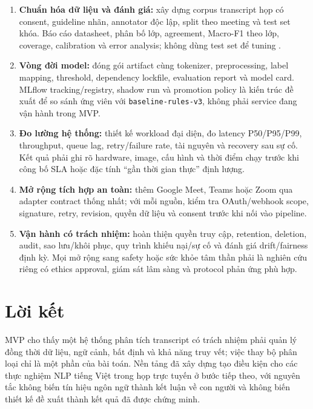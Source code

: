 \begin{enumerate}
  \item \textbf{Chuẩn hóa dữ liệu và đánh giá:} xây dựng corpus transcript họp có consent, guideline nhãn, annotator độc lập, split theo meeting và test set khóa. Báo cáo datasheet, phân bố lớp, agreement, Macro-F1 theo lớp, coverage, calibration và error analysis; không dùng test set để tuning \cite{gebru2021,artstein2008}.
  \item \textbf{Vòng đời model:} đóng gói artifact cùng tokenizer, preprocessing, label mapping, threshold, dependency lockfile, evaluation report và model card. MLflow tracking/registry, shadow run và promotion policy là kiến trúc đề xuất để so sánh ứng viên với \texttt{baseline-rules-v3}, không phải service đang vận hành trong MVP.
  \item \textbf{Đo lường hệ thống:} thiết kế workload đại diện, đo latency P50/P95/P99, throughput, queue lag, retry/failure rate, tài nguyên và recovery sau sự cố. Kết quả phải ghi rõ hardware, image, cấu hình và thời điểm chạy trước khi công bố SLA hoặc đặc tính ``gần thời gian thực'' định lượng.
  \item \textbf{Mở rộng tích hợp an toàn:} thêm Google Meet, Teams hoặc Zoom qua adapter contract thống nhất; với mỗi nguồn, kiểm tra OAuth/webhook scope, signature, retry, revision, quyền dữ liệu và consent trước khi nối vào pipeline.
  \item \textbf{Vận hành có trách nhiệm:} hoàn thiện quyền truy cập, retention, deletion, audit, sao lưu/khôi phục, quy trình khiếu nại/sự cố và đánh giá drift/fairness định kỳ. Mọi mở rộng sang safety hoặc sức khỏe tâm thần phải là nghiên cứu riêng có ethics approval, giám sát lâm sàng và protocol phản ứng phù hợp.
\end{enumerate}

\section{Lời kết}
MVP cho thấy một hệ thống phân tích transcript có trách nhiệm phải quản lý đồng thời dữ liệu, ngữ cảnh, bất định và khả năng truy vết; việc thay bộ phân loại chỉ là một phần của bài toán. Nền tảng đã xây dựng tạo điều kiện cho các thực nghiệm NLP tiếng Việt trong họp trực tuyến ở bước tiếp theo, với nguyên tắc không biến tín hiệu ngôn ngữ thành kết luận về con người và không biến thiết kế đề xuất thành kết quả đã được chứng minh.

